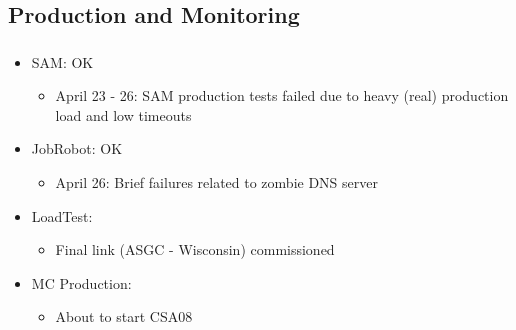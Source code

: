 \documentclass{beamer}
\begin{document}
\subsection{Production and Monitoring}
\begin{frame}
\frametitle{}
\begin{itemize}
    \item SAM: OK
    \begin{itemize}
        \item April 23 - 26: SAM production tests failed due to heavy (real) production load and low timeouts
    \end{itemize}
    \item JobRobot: OK 
    \begin{itemize}
        \item April 26: Brief failures related to zombie DNS server
    \end{itemize}
    \item LoadTest:
    \begin{itemize}
        \item Final link (ASGC - Wisconsin) commissioned
    \end{itemize}
    \item MC Production:
    \begin{itemize}
        \item About to start CSA08
    \end{itemize}
\end{itemize}
\end{frame}
\end{document}
